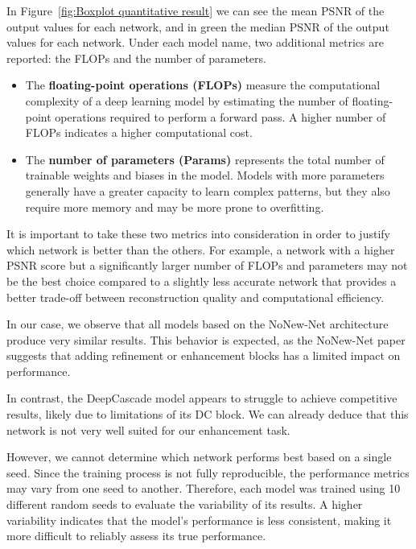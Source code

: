 \documentclass[12pt]{article}
\begin{document}
In Figure~\ref{fig:Boxplot quantitative result} we can see the mean PSNR of the output values for each network, and in green the median PSNR of the output values for each network.
Under each model name, two additional metrics are reported: the FLOPs and the number of parameters.

\begin{itemize}
    \item The \textbf{floating-point operations (FLOPs)} measure the computational complexity of a deep learning model by estimating the number of floating-point operations required to perform a forward pass.
    A higher number of FLOPs indicates a higher computational cost.
    
    \item The \textbf{number of parameters (Params)} represents the total number of trainable weights and biases in the model. 
    Models with more parameters generally have a greater capacity to learn complex patterns, but they also require more memory and may be more prone to overfitting.
\end{itemize}

It is important to take these two metrics into consideration in order to justify which network is better than the others.
For example, a network with a higher PSNR score but a significantly larger number of FLOPs and parameters may not be the best choice compared to a slightly less accurate network that provides a better trade-off between reconstruction quality and computational efficiency.
\vspace{0.5cm}

In our case, we observe that all models based on the NoNew-Net architecture produce very similar results.
This behavior is expected, as the NoNew-Net paper suggests that adding refinement or enhancement blocks has a limited impact on performance.
\vspace{0.5cm}

In contrast, the DeepCascade model appears to struggle to achieve competitive results, likely due to limitations of its DC block.
We can already deduce that this network is not very well suited for our enhancement task.
\vspace{0.5cm}

However, we cannot determine which network performs best based on a single seed. 
Since the training process is not fully reproducible, the performance metrics may vary from one seed to another. 
Therefore, each model was trained using 10 different random seeds to evaluate the variability of its results. 
A higher variability indicates that the model's performance is less consistent, making it more difficult to reliably assess its true performance.
\end{document}
